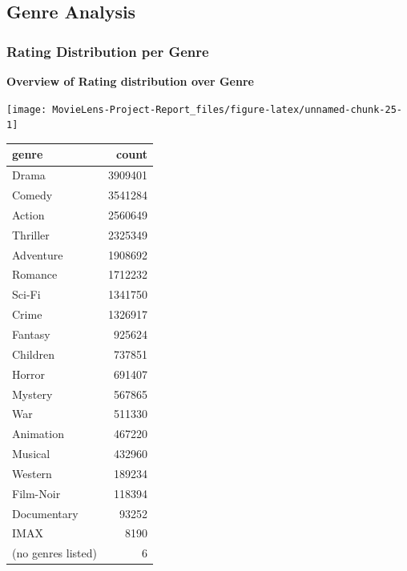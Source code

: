 \documentclass[
]{article}
\begin{document}
\hypertarget{genre-analysis}{%
\subsection{Genre Analysis}\label{genre-analysis}}

\hypertarget{rating-distribution-per-genre}{%
\subsubsection{Rating Distribution per
Genre}\label{rating-distribution-per-genre}}

\textbf{Overview of Rating distribution over Genre}

\begin{center}\texttt{[image: MovieLens-Project-Report\_files/figure-latex/unnamed-chunk-25-1]} \end{center}

\begin{table}
\centering\begingroup\fontsize{10}{12}\selectfont

\begin{tabular}{l|r}
\hline
genre & count\\
\hline
Drama & 3909401\\
\hline
Comedy & 3541284\\
\hline
Action & 2560649\\
\hline
Thriller & 2325349\\
\hline
Adventure & 1908692\\
\hline
Romance & 1712232\\
\hline
Sci-Fi & 1341750\\
\hline
Crime & 1326917\\
\hline
Fantasy & 925624\\
\hline
Children & 737851\\
\hline
Horror & 691407\\
\hline
Mystery & 567865\\
\hline
War & 511330\\
\hline
Animation & 467220\\
\hline
Musical & 432960\\
\hline
Western & 189234\\
\hline
Film-Noir & 118394\\
\hline
Documentary & 93252\\
\hline
IMAX & 8190\\
\hline
(no genres listed) & 6\\
\hline
\end{tabular}
\endgroup{}
\end{table}
\end{document}
